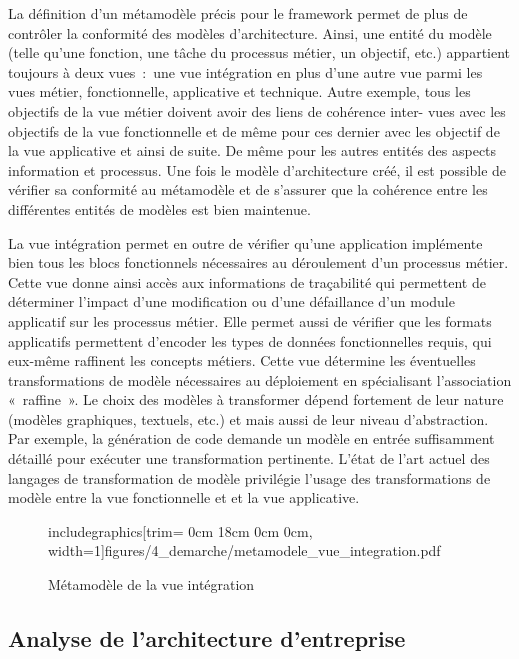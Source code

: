 La définition d'un métamodèle précis pour le framework permet de plus de
contrôler la conformité des modèles d'architecture. Ainsi, une entité du modèle
(telle qu'une fonction, une tâche du processus métier, un objectif, etc.)
appartient toujours à deux vues~:~une vue intégration en plus d'une autre vue
parmi les vues métier, fonctionnelle, applicative et technique. Autre exemple,
tous les objectifs de la vue métier doivent avoir des liens de cohérence inter-
vues avec les objectifs de la vue fonctionnelle et de même pour ces dernier
avec les objectif de la vue applicative et ainsi de suite. De même pour les
autres entités des aspects information et processus. Une fois le modèle
d'architecture créé, il est possible de vérifier sa conformité au métamodèle et
de s'assurer que la cohérence entre les différentes entités de modèles est bien
maintenue.

La vue intégration permet en outre de vérifier qu'une application implémente
bien tous les blocs fonctionnels nécessaires au déroulement d'un processus
métier. Cette vue donne ainsi accès aux informations de traçabilité qui
permettent de déterminer l'impact d'une modification ou d'une défaillance d'un
module applicatif sur les processus métier. Elle permet aussi de vérifier que
les formats applicatifs permettent d'encoder les types de données fonctionnelles
requis, qui eux-même raffinent les concepts métiers. Cette vue détermine les
éventuelles transformations de modèle nécessaires au déploiement en spécialisant
l'association «~raffine~». Le choix des modèles à transformer dépend fortement
de leur nature (modèles graphiques, textuels, etc.) et mais aussi de leur niveau
d'abstraction. Par exemple, la génération de code demande un modèle en entrée
suffisamment détaillé pour exécuter une transformation pertinente. L'état de
l'art actuel des langages de transformation de modèle privilégie l'usage des
transformations de modèle entre la vue fonctionnelle et et la vue applicative.


\begin{figure}[!ht] \begin{center}
includegraphics[trim= 0cm 18cm 0cm 0cm, width=1\textwidth]{figures/4_demarche/metamodele_vue_integration.pdf}
\end{center}
\caption{Métamodèle de la vue intégration}
\label{fig:metamodele_vue_integration}
\end{figure}


\subsection{Analyse de l'architecture d'entreprise}

